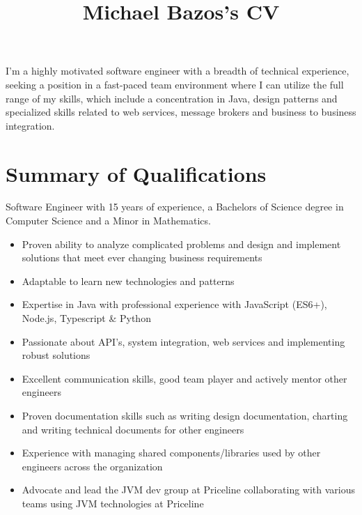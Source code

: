 \documentclass[a4paper,online]{adcv}
\title{Michael Bazos’s CV}
\begin{document}
I’m a highly motivated software engineer with a breadth of technical experience, seeking a position in a fast-paced team environment where I can utilize the full range of my skills, which include a concentration in Java, design patterns and specialized skills related to web services, message brokers and business to business integration.

\section{Summary of Qualifications}

\begin{adcvtabletwo}
Software Engineer with 15 years of experience, a Bachelors of Science degree in Computer Science and a Minor in Mathematics.
  \begin{itemize}
    \item Proven ability to analyze complicated problems and design and implement solutions that meet ever changing business requirements
    \item Adaptable to learn new technologies and patterns
    \item Expertise in Java with professional experience with JavaScript (ES6+), Node.js, Typescript \& Python
    \item Passionate about API's, system integration, web services and implementing robust solutions
    \item Excellent communication skills, good team player and actively mentor other engineers
    \item Proven documentation skills such as writing design documentation, charting and writing technical documents for other engineers
    \item Experience with managing shared components/libraries used by other engineers across the organization
    \item Advocate and lead the JVM dev group at Priceline collaborating with various teams using JVM technologies at Priceline
  \end{itemize}
\end{adcvtabletwo}
\end{document}

